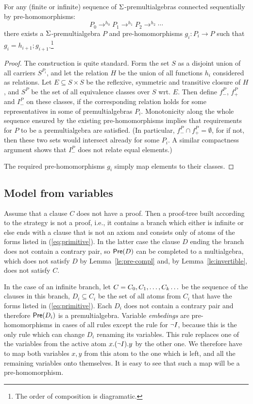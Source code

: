 \begin{lemma}\label {le:contin}
For any (finite or infinite) sequence of $\Funcs $-premultialgebras connected
sequentially by pre-homomorphisms:
\[
P_0\mathop{\longrightarrow}^{h_0} P_1 \mathop{\longrightarrow}^{h_1} P_2
\mathop{\longrightarrow}^{h_2} \cdots
\]
there exists a $\Funcs $-premultialgebra $P$ and pre-homomorphisms \(g_i:
P_i\to P\) such that \(g_i=h_{i+1};g_{i+1}\).\footnote {The order of
composition is diagramatic.}
\end{lemma}
\begin{proof}
The construction is quite standard.  Form the set $S$ as a
disjoint union of all carriers $S^{P_i}$, and let the relation $H$ be the
union of all functions $h_i$ considered as relations.  Let $E\subseteq S\times S$
be the reflexive, symmetric and transitive closure of $H$, and
$S^P$ be the set of all equivalence classes over $S$ wrt. $E$.  Then define
 $f^P_-$, $f^P_+$ and $I^P_-$ on these classes, if the corresponding relation holds 
for some representatives in some of premultialgebras $P_i$.  
Monotonicity along the whole
sequence ensured by the existing pre-homomorphisms implies that requirements
for $P$ to be a premultialgebra are satisfied. (In particular, 
$f^P_-\cap f^P_+ =\emptyset$, for if not, then these two sets would intersect
already for some $P_i$. A similar compactness argument shows that $I^P_-$ does not
relate equal elements.)

The required pre-homomorphisms $g_i$ simply map elements to their classes.
\end{proof}

\subsection{Model from variables}

Assume that a clause $C$ does not have a proof. Then a proof-tree built according
to the strategy is not a proof, i.e., it contains a branch which either is
infinite or else ends with a clause that is not an axiom and consists only of
atoms of the forms listed in (\ref {eq:primitive}).  In the latter case the
clause $D$ ending the branch does not contain a contrary pair, so \(\Pre D\)
can be completed to a multialgebra, which does not satisfy $D$ 
by Lemma~\ref{le:pre-compl} and, by Lemma~\ref {le:invertible}, does not satisfy $C$.

In the case of an infinite branch, let \(C=C_0,\List Ck,\ldots\) be the
sequence of the clauses in this branch, \(D_i\subseteq C_i\) be the set
of all atoms from $C_i$ that have the forms listed in (\ref {eq:primitive}).
Each $D_i$ does not contain a contrary pair and therefore \(\Pre {D_i}\) is a
premultialgebra.  Variable {\em embedings} are pre-homomorphisms in cases of all rules
except the rule for \(\Neg I\), because this is the only rule which can change
$D_i$ renaming its variables.  
This rule replaces one of the variables from the active atom \(x.(\Neg I).y\)
by the other one. 
We therefore have to map both variables $x,y$ from this atom  to the one which is
left, and all the remaining variables onto themselves.
It is easy to see that such a map will be a pre-homomorphism.  

